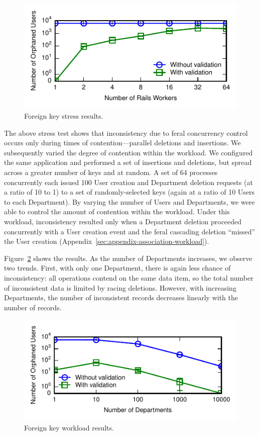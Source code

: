 \begin{figure}
\includegraphics[width=\columnwidth]{figs/fk-stress-violations.pdf}\vspace{-1em}
\caption{Foreign key stress results.}
\label{fig:fk-stress}
\end{figure}

The above stress test shows that inconsistency due to feral
concurrency control occurs only during times of contention---parallel
deletions and insertions. We subsequently varied the degree of
contention within the workload. We configured the same application and
performed a set of insertions and deletions, but spread across a
greater number of keys and at random. A set of 64 processes
concurrently each issued 100 User creation and Department deletion
requests (at a ratio of 10 to 1) to a set of randomly-selected keys
(again at a ratio of 10 Users to each Department). By varying the
number of Users and Departments, we were able to control the amount of
contention within the workload. Under this workload, inconsistency
resulted only when a Department deletion proceeded concurrently with a
User creation event and the feral cascading deletion ``missed'' the
User creation (Appendix~\ref{sec:appendix-association-workload}).

Figure~\ref{fig:fk-workload} shows the results. As the number of
Departments increases, we observe two trends. First, with only one
Department, there is again less chance of inconsistency: all
operations contend on the same data item, so the total number of
inconsistent data is limited by racing deletions. However, with
increasing Departments, the number of inconsistent records decreases
linearly with the number of records.

\begin{figure}
\includegraphics[width=\columnwidth]{figs/fk-workload-violations.pdf}\vspace{-1em}
\caption{Foreign key workload results.}
\label{fig:fk-workload}
\end{figure}

